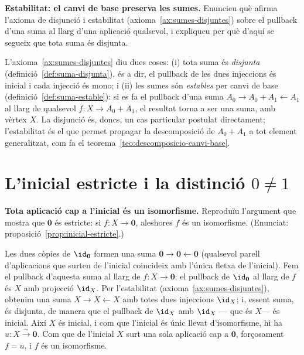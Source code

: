 \begin{exercici}
\textbf{Estabilitat: el canvi de base preserva les sumes.} Enuncieu què afirma l'axioma de disjunció i estabilitat (axioma~\ref{ax:sumes-disjuntes}) sobre el pullback d'una suma al llarg d'una aplicació qualsevol, i expliqueu per què d'aquí se segueix que tota suma és disjunta.
\end{exercici}
\begin{solucio}
L'axioma~\ref{ax:sumes-disjuntes} diu dues coses: (i) tota suma és \emph{disjunta} (definició~\ref{def:suma-disjunta}), és a dir, el pullback de les dues injeccions és inicial i cada injecció és mono; i (ii) les sumes són \emph{estables} per canvi de base (definició~\ref{def:suma-estable}): si es fa el pullback d'una suma \(A_0\to A_0+A_1\leftarrow A_1\) al llarg de qualsevol \(f:X\to A_0+A_1\), el resultat torna a ser una suma, amb vèrtex \(X\). La disjunció és, doncs, un cas particular postulat directament; l'estabilitat és el que permet propagar la descomposició de \(A_0+A_1\) a tot element generalitzat, com fa el teorema~\ref{teo:descomposicio-canvi-base}.
\end{solucio}

\section{L'inicial estricte i la distinció \texorpdfstring{\(0\neq1\)}{0!=1}}\label{prac:zero-u}

\begin{exercici}
\textbf{Tota aplicació cap a l'inicial és un isomorfisme.} Reproduïu l'argument que mostra que \(\mathbf0\) és estricte: si \(f:X\to\mathbf0\), aleshores \(f\) és un isomorfisme. (Enunciat: proposició~\ref{prop:inicial-estricte}.)
\end{exercici}
\begin{solucio}
Les dues còpies de \(\id_{\mathbf0}\) formen una suma \(\mathbf0\to\mathbf0\leftarrow\mathbf0\) (qualsevol parell d'aplicacions que surten de l'inicial coincideix amb l'única fletxa de l'inicial). Fem el pullback d'aquesta suma al llarg de \(f:X\to\mathbf0\): el pullback de \(\id_{\mathbf0}\) al llarg de \(f\) és \(X\) amb projecció \(\id_X\). Per l'estabilitat (axioma~\ref{ax:sumes-disjuntes}), obtenim una suma \(X\to X\leftarrow X\) amb totes dues injeccions \(\id_X\); i, essent suma, és disjunta, de manera que el pullback de \(\id_X\) amb \(\id_X\) --- que és \(X\)--- és inicial. Així \(X\) és inicial, i com que l'inicial és únic llevat d'isomorfisme, hi ha \(u:X\xrightarrow{\sim}\mathbf0\). Com que de l'inicial \(X\) surt una sola aplicació cap a \(\mathbf0\), forçosament \(f=u\), i \(f\) és un isomorfisme.
\end{solucio}

